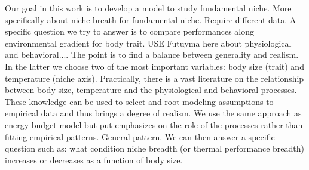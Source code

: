 Our goal in this work is to develop a model to study fundamental niche.
More specifically about niche breath for fundamental niche.
Require different data.
A specific question we try to answer is to compare performances along environmental gradient for body trait.
USE Futuyma here about physiological and behavioral....
The point is to find a balance between generality and realism.
In the latter we choose two of the most important variables: body size (trait) and temperature (niche axis).
Practically, there is a vast literature on the relationship between body size, temperature and the physiological and behavioral processes.
These knowledge can be used to select and root modeling assumptions to empirical data and thus brings a degree of realism.
We use the same approach as energy budget model but put emphasizes on the role of the processes rather than fitting empirical patterns.
General pattern.
We can then answer a specific question such as: what condition niche breadth (or thermal performance breadth) increases or decreases as a function of body size.



